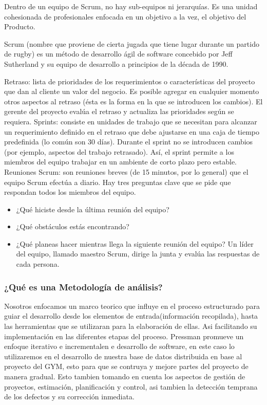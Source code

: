 \documentclass[spanish, 12pt]{article}
\providecommand{\tightlist}{\setlength{\itemsep}{0pt}
\setlength{\parskip}{0pt}}
\begin{document}
	Dentro de un equipo de Scrum, no hay sub-equipos ni jerarquías. Es una unidad
	cohesionada de profesionales enfocada en un objetivo a la vez, el objetivo del
	Producto.

	Scrum (nombre que proviene de cierta jugada que tiene lugar durante un partido
	de rugby) es un método de desarrollo ágil de software concebido por Jeff Sutherland
	y su equipo de desarrollo a principios de la década de 1990.

	Retraso: lista de prioridades de los requerimientos o características del proyecto
	que dan al cliente un valor del negocio. Es posible agregar en cualquier
	momento otros aspectos al retraso (ésta es la forma en la que se introducen los
	cambios). El gerente del proyecto evalúa el retraso y actualiza las prioridades
	según se requiera. Sprints: consiste en unidades de trabajo que se necesitan para
	alcanzar un requerimiento definido en el retraso que debe ajustarse en una caja
	de tiempo predefinida (lo común son 30 días). Durante el sprint no se
	introducen cambios (por ejemplo, aspectos del trabajo retrasado). Así, el sprint
	permite a los miembros del equipo trabajar en un ambiente de corto plazo pero estable.
	Reuniones Scrum: son reuniones breves (de 15 minutos, por lo general) que el
	equipo Scrum efectúa a diario. Hay tres preguntas clave que se pide que respondan
	todos los miembros del equipo.

	\begin{itemize}
		\tightlist

		\item ¿Qué hiciste desde la última reunión del equipo?

		\item ¿Qué obstáculos estás encontrando?

		\item ¿Qué planeas hacer mientras llega la siguiente reunión del equipo? Un
			líder del equipo, llamado maestro Scrum, dirige la junta y evalúa las
			respuestas de cada persona.
	\end{itemize}

	\subsubsection{¿Qué es una Metodología de análisis?}
	\label{quuxe9-es-una-metodologuxeda-de-anuxe1lisis}

	Nosotros enfocamos un marco teorico que influye en el proceso estructurado para
	guiar el desarrollo desde los elementos de entrada(información recopilada), hasta
	las herramientas que se utilizaran para la elaboración de ellas. Asi
	facilitando su implementación en las diferentes etapas del proceso. Pressman promueve
	un enfoque iterativo e incrementalen e desarrollo de software, en este caso lo
	utilizaremos en el desarrollo de nuestra base de datos distribuida en base al
	proyecto del GYM, esto para que se contruya y mejore partes del proyecto de manera
	gradual. Esto tambien tomando en cuenta los aspectos de gestión de proyectos, estimación,
	planificación y control, asi tambien la detección temprana de los defectos y su
	corrección inmediata.
\end{document}
